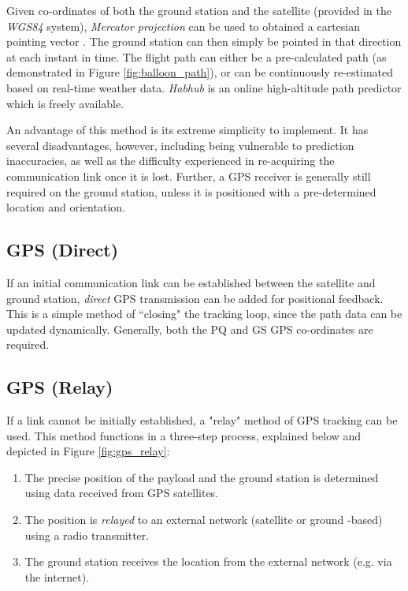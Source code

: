 Given co-ordinates of both the ground station and the satellite (provided in the \textit{WGS84} system), \textit{Mercator projection} can be used to obtained a cartesian pointing vector \cite{site-mercator}. The ground station can then simply be pointed in that direction at each instant in time. The flight path can either be a pre-calculated path (as demonstrated in Figure \ref{fig:balloon_path}), or can be continuously re-estimated based on real-time weather data. \textit{Habhub} is an online high-altitude path predictor \cite{site-habHub} which is freely available.

An advantage of this method is its extreme simplicity to implement. It has several disadvantages, however, including being vulnerable to prediction inaccuracies, as well as the difficulty experienced in re-acquiring the communication link once it is lost. Further, a GPS receiver is generally still required on the ground station, unless it is positioned with a pre-determined location and orientation.

\subsection{GPS (Direct)}
If an initial communication link can be established between the satellite and ground station, \textit{direct} GPS transmission can be added for positional feedback. This is a simple method of ``closing" the tracking loop, since the path data can be updated dynamically. Generally, both the PQ and GS GPS co-ordinates are required.

\subsection{GPS (Relay)}
If a link cannot be initially established, a "relay" method of GPS tracking can be used. This method functions in a three-step process, explained below and depicted in Figure \ref{fig:gps_relay}:
\begin{enumerate}
    \item The precise position of the payload and the ground station is determined using data received from GPS satellites.
    \item The position is \textit{relayed} to an external network (satellite or ground -based) using a radio transmitter.
    \item The ground station receives the location from the external network (e.g. via the internet).
\end{enumerate}


